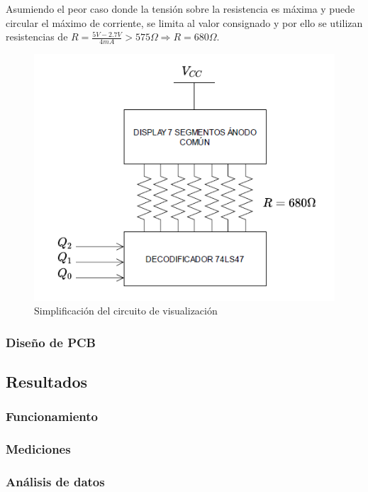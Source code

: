 Asumiendo el peor caso donde la tensi\'on sobre la resistencia es m\'axima y puede circular el m\'aximo de corriente, se limita al valor consignado y por ello se utilizan resistencias
de $R = \frac{5V - 2.7V}{4mA} > 575 \Omega \Rightarrow R = 680 \Omega$.

\begin{figure}[H]
    \centering
        \includegraphics[scale=0.6]{../EJ7/Recursos/visualizacion_simple.png}
    \caption{Simplificaci\'on del circuito de visualizaci\'on}
    \label{fig:visualizacion_simple_circuito}
\end{figure}

\subsubsection{Dise\~no de PCB}

\subsection{Resultados}
\subsubsection{Funcionamiento}
\subsubsection{Mediciones}
\subsubsection{An\'alisis de datos}
